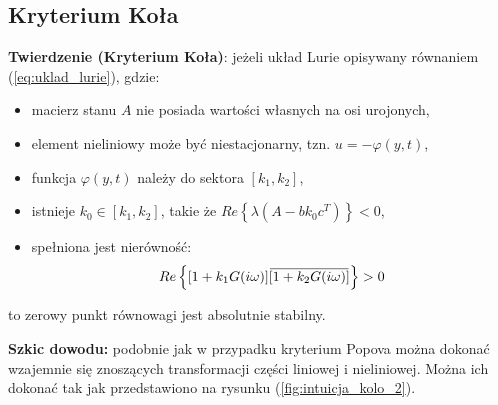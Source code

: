 \documentclass{article}
\newcommand{\overbar}[1]{\mkern 1.5mu\overline{\mkern-1.5mu#1\mkern-1.5mu}\mkern 1.5mu}
\begin{document}
    \subsection{Kryterium Koła}
    \textbf{Twierdzenie (Kryterium Koła)}: jeżeli układ Lurie opisywany równaniem (\ref{eq:uklad_lurie}), gdzie:
    \begin{itemize}
        \item macierz stanu $A$ nie posiada wartości własnych na osi urojonych,
        \item element nieliniowy może być niestacjonarny, tzn. $u = -\varphi(y,t)$,
        \item funkcja $\varphi(y,t)$ należy do sektora $[k_{1}, k_{2}]$,
        \item istnieje $k_{0} \in [k_{1},k_{2}]$, takie że $Re\left\{ \lambda(A-bk_{0}c^{T}) \right\} < 0$,
        \item spełniona jest nierówność:
        $$
            Re\left\{ [1 + k_{1}G(i\omega)]\overbar{[1 + k_{2}G(i\omega)]} \right\} > 0
        $$
    \end{itemize}
    to zerowy punkt równowagi jest absolutnie stabilny.
    
    \textbf{Szkic dowodu:}
    podobnie jak w przypadku kryterium Popova można dokonać wzajemnie się znoszących transformacji części liniowej i nieliniowej.
    Można ich dokonać tak jak przedstawiono na rysunku (\ref{fig:intuicja_kolo_2}).

        
\end{document}
